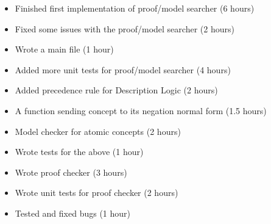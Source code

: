 %
{ \begin{itemize} 
  \item Finished first implementation of proof/model searcher (6 hours)
  \item Fixed some issues with the proof/model searcher (2 hours)
  \item Wrote a main file (1 hour)
 \end{itemize} 
}%
{ \begin{itemize} 
 \item Added more unit tests for proof/model searcher (4 hours)
 \end{itemize} 
}%
{ \begin{itemize} 
  \item Added precedence rule for Description Logic (2 hours)
  \item A function sending concept to its negation normal form (1.5 hours)
  \item Model checker for atomic concepts (2 hours)
  \item Wrote tests for the above (1 hour)
 \end{itemize} 
}%
{ \begin{itemize} 
  \item Wrote proof checker  (3 hours)
  \item Wrote unit tests for proof checker  (2 hours)
  \item Tested and fixed bugs (1 hour)
 \end{itemize} 
}%


